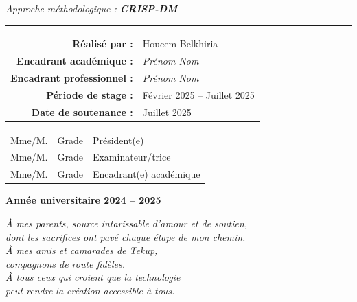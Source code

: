 \documentclass[12pt,a4paper,oneside]{report}
\begin{document}
\begin{titlepage}
\vspace{0.3cm}
{\normalsize\itshape Approche méthodologique : \textbf{CRISP-DM}}

\vspace{0.5cm}\rule{0.6\linewidth}{0.8pt}\vspace{0.4cm}

\begin{tabular}{rl}
\textbf{Réalisé par :}              & Houcem Belkhiria \\[4pt]
\textbf{Encadrant académique :}     & \textit{Prénom Nom} \\[2pt]
\textbf{Encadrant professionnel :}  & \textit{Prénom Nom} \\[4pt]
\textbf{Période de stage :}         & Février 2025 -- Juillet 2025 \\[2pt]
\textbf{Date de soutenance :}       & Juillet 2025 \\
\end{tabular}

\vspace{0.5cm}
\begin{tcolorbox}[colback=gray!5,colframe=gray!50,boxrule=0.5pt,
  arc=3pt,left=8pt,right=8pt,top=4pt,bottom=4pt,
  title={\small\bfseries Jury},fonttitle=\bfseries\small]
\small
\begin{tabular}{lll}
Mme/M. \underline{\hspace{3.5cm}} & Grade & Président(e) \\[3pt]
Mme/M. \underline{\hspace{3.5cm}} & Grade & Examinateur/trice \\[3pt]
Mme/M. \underline{\hspace{3.5cm}} & Grade & Encadrant(e) académique \\
\end{tabular}
\end{tcolorbox}

\vfill{\small\bfseries Année universitaire 2024 -- 2025}
\end{titlepage}

\cleardoublepage\thispagestyle{empty}
\vspace*{8cm}
\begin{flushright}\large\itshape
À mes parents, source intarissable d'amour et de soutien,\\
dont les sacrifices ont pavé chaque étape de mon chemin.\\[1cm]
À mes amis et camarades de Tekup,\\
compagnons de route fidèles.\\[1cm]
À tous ceux qui croient que la technologie\\
peut rendre la création accessible à tous.
\end{flushright}
\end{document}
